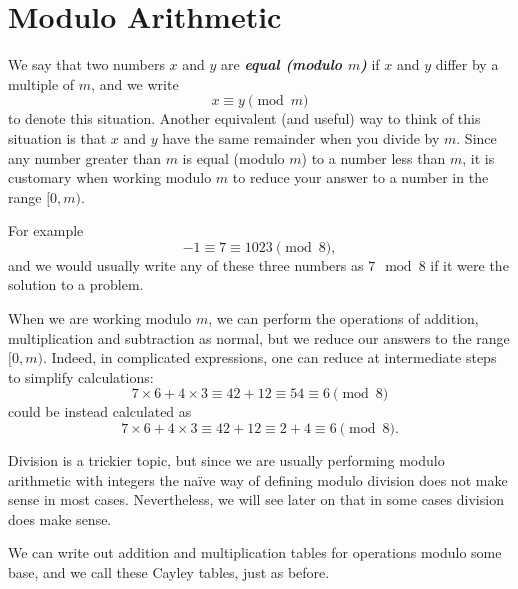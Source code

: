 \documentclass[10pt]{book}
\theoremstyle{break}
\newcounter{example}[section]
\newcommand{\defn}[2]{\textsl{\textbf{#1\index{#2|emph}}}}
\begin{document}
\section{Modulo Arithmetic}

We say that two numbers $x$ and $y$ are \defn{equal (modulo $m$)}{modulo|equality} if $x$ and
$y$ differ by a multiple of $m$, and we write
\[
  x \equiv y \pmod m
\]
to denote this situation.  Another equivalent (and useful) way to think of
this situation is that $x$ and $y$ have the same remainder when you divide
by $m$.  Since any number greater than $m$ is equal (modulo $m$) to a number
less than $m$, it is customary when working modulo $m$ to reduce your answer
to a number in the range $[0,m)$.

For example
\[
  -1 \equiv 7 \equiv 1023 \pmod 8,
\]
and we would usually write any of these three numbers as $7 \mod 8$ if it
were the solution to a problem.

When we are working modulo $m$, we can perform the operations of addition,
multiplication and subtraction as normal, but we reduce our answers to the
range $[0,m)$.  Indeed, in complicated expressions, one can reduce at
intermediate steps to simplify calculations:
\[
  7 \times 6 + 4 \times 3 \equiv 42 + 12 \equiv 54 \equiv 6 \pmod 8
\]
could be instead calculated as
\[
  7 \times 6 + 4 \times 3 \equiv 42 + 12 \equiv 2 + 4 \equiv 6 \pmod 8.
\]

Division is a trickier topic, but since we are usually performing modulo
arithmetic with integers the na\"{i}ve way of defining modulo division does
not make sense in most cases.  Nevertheless, we will see later on that in
some cases division does make sense.

We can write out addition and multiplication tables for operations modulo
some base, and we call these Cayley tables, just as before.
\end{document}
